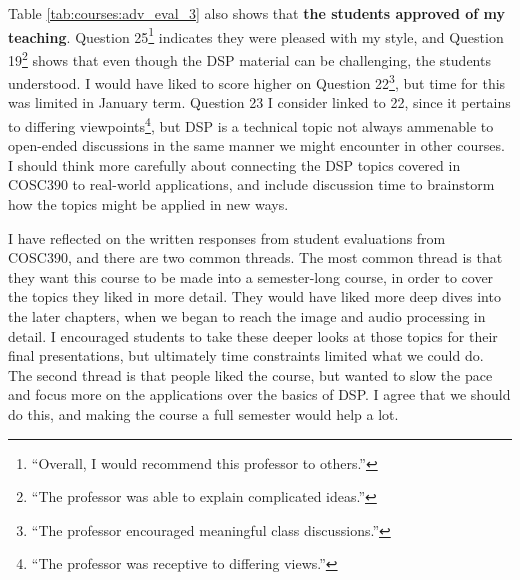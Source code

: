 \documentclass[../../main.tex]{subfiles}
\begin{document}
Table \ref{tab:courses:adv_eval_3} also shows that \textbf{the students approved of my teaching}.  Question 25\footnote{``Overall, I would recommend this professor to others.''} indicates they were pleased with my style, and Question 19\footnote{``The professor was able to explain complicated ideas.''} shows that even though the DSP material can be challenging, the students understood.  I would have liked to score higher on Question 22\footnote{``The professor encouraged meaningful class discussions.''}, but time for this was limited in January term.  Question 23 I consider linked to 22, since it pertains to differing viewpoints\footnote{``The professor was receptive to differing views.''}, but DSP is a technical topic not always ammenable to open-ended discussions in the same manner we might encounter in other courses.  I should think more carefully about connecting the DSP topics covered in COSC390 to real-world applications, and include discussion time to brainstorm how the topics might be applied in new ways. \\ \hspace{0.1cm}

I have reflected on the written responses from student evaluations from COSC390, and there are two common threads.  The most common thread is that they want this course to be made into a semester-long course, in order to cover the topics they liked in more detail.  They would have liked more deep dives into the later chapters, when we began to reach the image and audio processing in detail.  I encouraged students to take these deeper looks at those topics for their final presentations, but ultimately time constraints limited what we could do.  The second thread is that people liked the course, but wanted to slow the pace and focus more on the applications over the basics of DSP.  I agree that we should do this, and making the course a full semester would help a lot. \\ \hspace{0.1cm}
\end{document}
